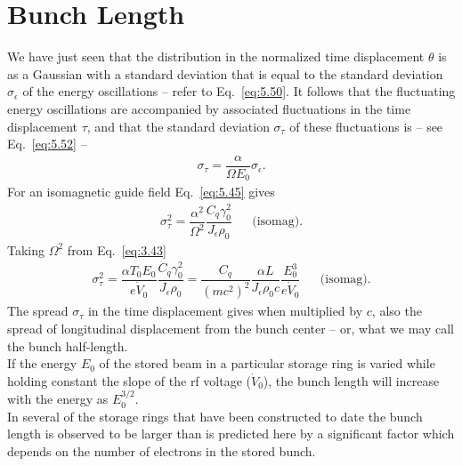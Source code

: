 \section{Bunch Length}\label{sec:5.4}

We have just seen that the distribution in the normalized time displacement $\theta$ is as a Gaussian with a standard deviation that is equal to the standard deviation $\sigma_\epsilon$ of the energy oscillations -- refer to Eq.~\eqref{eq:5.50}. It follows that the fluctuating energy oscillations are accompanied by associated fluctuations in the time displacement $\tau$, and that the standard deviation $\sigma_\tau$ of these fluctuations is -- see Eq.~\eqref{eq:5.52} --
\begin{align}
	\sigma_\tau = \dfrac{\alpha}{\Omega E_0} \sigma_\epsilon.
\end{align}
For an isomagnetic guide field Eq.~\eqref{eq:5.45} gives
\begin{align}
	\sigma_\tau^2 = \dfrac{\alpha^2}{\Omega^2} \dfrac{C_q \gamma_0^2}{J_\epsilon \rho_0} && \text{(isomag).}
\end{align}
Taking $\Omega^2$ from Eq.~\eqref{eq:3.43}
\begin{align}
	\sigma_\tau^2 = \dfrac{\alpha T_0 E_0}{e\dot{V}_0} \dfrac{C_q \gamma_0^2}{J_\epsilon \rho_0} = \dfrac{C_q}{(mc^2)^2} \dfrac{\alpha L}{J_\epsilon \rho_0 c} \dfrac{E_0^3}{e \dot{V}_0} && \text{(isomag).}
\end{align}
The spread $\sigma_\tau$ in the time displacement gives when multiplied by $c$, also the spread
of longitudinal displacement from the bunch center -- or, what we may call the bunch half-length.\\
If the energy $E_0$ of the stored beam in a particular storage ring is varied while holding constant the slope of the rf voltage ($\dot{V}_0$), the bunch length will increase with the energy as $E_0^{3/2}$.\\
In several of the storage rings that have been constructed to date the bunch length is observed to be larger than is predicted here by a significant factor which depends on the number of electrons
 in the stored bunch.
